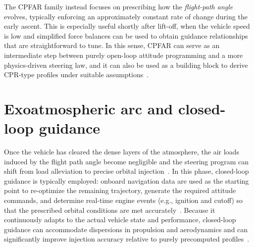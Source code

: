 The CPFAR family instead focuses on prescribing how the \emph{flight-path angle} evolves, typically enforcing an approximately constant rate of change during the early ascent. This is especially useful shortly after lift-off, when the vehicle speed is low and simplified force balances can be used to obtain guidance relationships that are straightforward to tune. In this sense, CPFAR can serve as an intermediate step between purely open-loop attitude programming and a more physics-driven steering law, and it can also be used as a building block to derive CPR-type profiles under suitable assumptions~\cite{Ulrich}.


\section{Exoatmospheric arc and closed-loop guidance}

Once the vehicle has cleared the dense layers of the atmosphere, the air loads induced by the flight path angle become negligible and the steering program can shift from load alleviation to precise orbital injection~\cite{Edberg}. In this phase, closed-loop guidance is typically employed: onboard navigation data are used as the starting point to re-optimize the remaining trajectory, generate the required attitude commands, and determine real-time engine events (e.g., ignition and cutoff) so that the prescribed orbital conditions are met accurately~\cite{tewari2011advanced}.
Because it continuously adapts to the actual vehicle state and performance, closed-loop guidance can accommodate dispersions in propulsion and aerodynamics and can significantly improve injection accuracy relative to purely precomputed profiles~\cite{SongZhaoTheil2023AutonomousTrajectory}.


